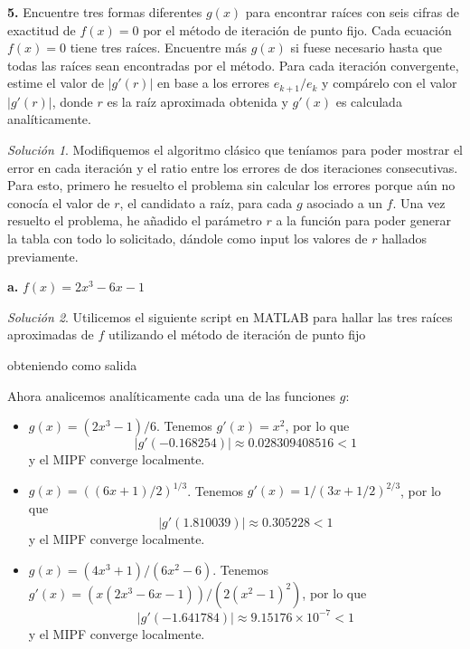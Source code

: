 \documentclass{article}
\newenvironment{statement}[1]{\smallskip\noindent\color[rgb]{1.00,0.00,0.50} {\bf #1.}}{}
\theoremstyle{definition}
\theoremstyle{remark}
\newtheorem*{solution}{Soluci\'on}
\begin{document}
\begin{statement}{5}
  Encuentre tres formas diferentes $g(x)$ para encontrar ra\'ices con seis
  cifras de exactitud de $f(x) = 0$ por el m\'etodo de iteraci\'on de punto fijo.
  Cada ecuaci\'on $f(x) = 0$ tiene tres ra\'ices. Encuentre m\'as $g(x)$ si fuese
  necesario hasta que todas las ra\'ices sean encontradas por el m\'etodo.
  Para cada iteraci\'on convergente, estime el valor de $|g'(r)|$ en base a
  los errores $e_{k + 1} / e_k$ y comp\'arelo con el valor $|g'(r)|$, donde $r$
  es la ra\'iz aproximada obtenida y $g'(x)$ es calculada anal\'iticamente.
\end{statement}

\begin{solution}
  Modifiquemos el algoritmo cl\'asico que ten\'iamos para poder mostrar el error
  en cada iteraci\'on y el ratio entre los errores de dos iteraciones consecutivas.
  Para esto, primero he resuelto el problema sin calcular los errores porque a\'un
  no conoc\'ia el valor de $r$, el candidato a ra\'iz, para cada $g$ asociado a un $f$.
  Una vez resuelto el problema, he a\~nadido el par\'ametro $r$ a la funci\'on para poder
  generar la tabla con todo lo solicitado, d\'andole como input los valores de $r$
  hallados previamente.
  
\end{solution}

\begin{statement}{a}
  $f(x) = 2x^3 - 6x - 1$
\end{statement}

\begin{solution}
  Utilicemos el siguiente script en MATLAB para hallar las tres ra\'ices aproximadas
  de $f$ utilizando el m\'etodo de iteraci\'on de punto fijo
  
  obteniendo como salida

  

  Ahora analicemos anal\'iticamente cada una de las funciones $g$:
  \begin{itemize}
    \item $g(x) = (2x^3 - 1) / 6$. Tenemos $g'(x) = x^2$, por lo que
    \[
      |g'(-0.168254)| \approx 0.028309408516 < 1
    \]
    y el MIPF converge localmente.
    \item $g(x) = ((6x + 1) / 2)^{1 / 3}$. Tenemos $g'(x) = 1 / (3x + 1/2)^{2 / 3}$, por lo que
    \[
      |g'(1.810039)| \approx 0.305228 < 1  
    \]
    y el MIPF converge localmente.
    \item $g(x) = (4x^3 + 1) / (6x^2 - 6)$. Tenemos $g'(x) = (x (2x^3 - 6x - 1)) / (2(x^2 - 1)^2)$, por lo que
    \[
      |g'(-1.641784)| \approx 9.15176 \times 10^{-7}< 1
    \]
    y el MIPF converge localmente.
  \end{itemize}
\end{solution}
\end{document}

